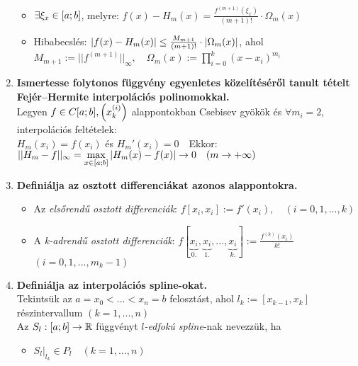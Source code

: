 \documentclass{article}
\begin{document}
\begin{enumerate}
\begin{itemize}
		\item $\exists\xi_x\in[a;b]$, melyre: {\Large$f(x)-H_m(x)=
		\frac{f^{(m+1)}(\xi_x)}{(m+1)!}\cdot\Omega_m(x)$}%
		\item Hibabecslés: {\Large$\abs{f(x)-H_m(x)}\leq\frac{M_{m+1}}{(m+1)!}\cdot
		\abs{\Omega_m(x)}$}, ahol\\[0.2cm] {\Large $M_{m+1}:=||f^{(m+1)}||_\infty,
		\quad\Omega_m(x):=\prod\limits_{i=0}^k(x-x_i)^{m_i}$}
	\end{itemize}
	\item\textbf{Ismertesse folytonos függvény egyenletes közelítéséről tanult tételt Fejér–Hermite interpolációs polinomokkal.}\\[0.2cm]
	Legyen $f\in C[a;b],\Big(x_k^{(i)}\Big)$ alappontokban Csebisev gyökök és $\forall 
	m_i=2$,	interpolációs feltételek:\\[0.2cm]{\Large$H_m(x_i)=f(x_i)$ és 
	$H_m'(x_i)=0\quad$}Ekkor:\\[0.4cm]{\Large $||H_m-f||_\infty
	=\max\limits_{x\in[a;b]}\abs{H_m(x)-f(x)}\to0\quad(m\to+\infty)$}
	\item\textbf{Definiálja az osztott differenciákat azonos alappontokra.}
	\begin{itemize}
		\item Az \textit{elsőrendű osztott differenciák}: {\Large$f[x_i,x_i]:=f'(x_i),
		\quad(i=0,1,...,k)$}\\
		\item A \textit{k-adrendű osztott differenciák}: {\Large
		$f[\underbrace{x_i}_{0.},\underbrace{x_i}_{1.},...,\underbrace{x_i}_{k.}]
		:=\frac{f^{(k)}(x_i)}{k!}$} $(i=0,1,...,m_k-1)$
	\end{itemize}
	\item\textbf{Definiálja az interpolációs spline-okat.}\\[0.1cm]
	Tekintsük az $a=x_0<...<x_n=b$ felosztást, ahol $l_k:=[x_{k-1},x_k]$ részintervallum
	$(k=1,...,n)$\\[0.1cm]Az $S_l:[a;b]\to\mathbb{R}$ függvényt $l$\textit{-edfokú spline}-nak
	nevezzük, ha
	\begin{itemize}
		\item{\Large$S_l|_{l_k}\in P_l\quad(k=1,...,n)$}

\end{itemize}
\end{enumerate}
\end{document}
